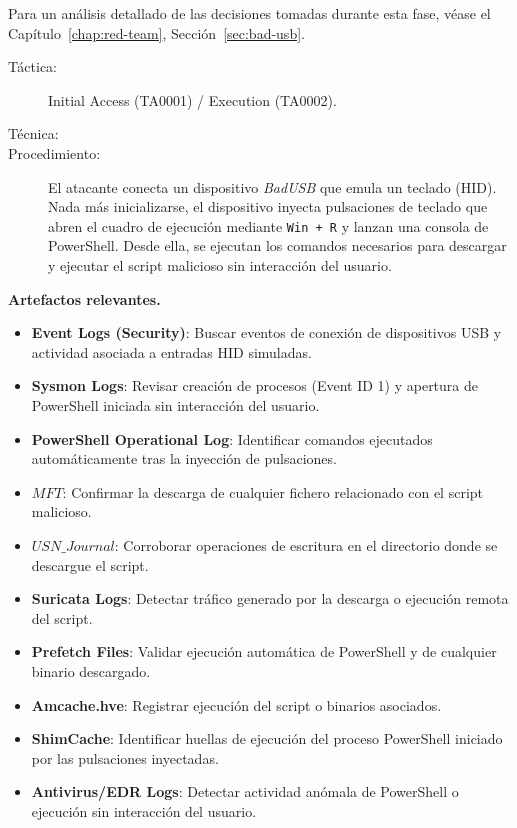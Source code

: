 Para un análisis detallado de las decisiones tomadas durante esta fase, véase el Capítulo~\ref{chap:red-team}, Sección~\ref{sec:bad-usb}.

\begin{leftbar}
    \begin{description}
        \item[Táctica:] Initial Access (TA0001) / Execution (TA0002).
        \item[Técnica:] 
        \item[Procedimiento:]  
        El atacante conecta un dispositivo \textit{BadUSB} que emula un teclado (HID). Nada más inicializarse, el dispositivo inyecta pulsaciones de teclado que abren el cuadro de ejecución mediante \texttt{Win + R} y lanzan una consola de PowerShell. Desde ella, se ejecutan los comandos necesarios para descargar y ejecutar el script malicioso sin interacción del usuario.
    \end{description}
\end{leftbar}

\textbf{Artefactos relevantes.}  
\begin{itemize}
    \item \textbf{Event Logs (Security)}: Buscar eventos de conexión de dispositivos USB y actividad asociada a entradas HID simuladas.
    \item \textbf{Sysmon Logs}: Revisar creación de procesos (Event ID 1) y apertura de PowerShell iniciada sin interacción del usuario.
    \item \textbf{PowerShell Operational Log}: Identificar comandos ejecutados automáticamente tras la inyección de pulsaciones.
    \item \textbf{$MFT$}: Confirmar la descarga de cualquier fichero relacionado con el script malicioso.
    \item \textbf{$USN\_Journal$}: Corroborar operaciones de escritura en el directorio donde se descargue el script.
    \item \textbf{Suricata Logs}: Detectar tráfico generado por la descarga o ejecución remota del script.
    \item \textbf{Prefetch Files}: Validar ejecución automática de PowerShell y de cualquier binario descargado.
    \item \textbf{Amcache.hve}: Registrar ejecución del script o binarios asociados.
    \item \textbf{ShimCache}: Identificar huellas de ejecución del proceso PowerShell iniciado por las pulsaciones inyectadas.
    \item \textbf{Antivirus/EDR Logs}: Detectar actividad anómala de PowerShell o ejecución sin interacción del usuario.
\end{itemize}

